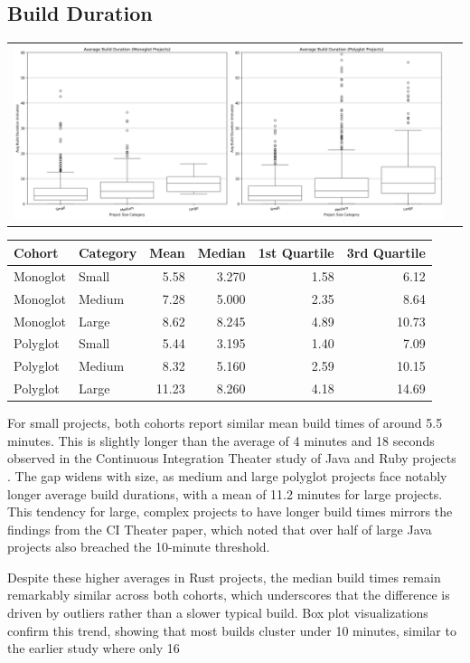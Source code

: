 \documentclass[11pt]{article}
\begin{document}
\subsection{Build Duration}
\begin{tabularx}{\linewidth}{@{}XX@{}}
\includegraphics[width=\linewidth]{figures/build_duration.jpg}
\end{tabularx}
\begin{center}
\begin{tabular}{llrrrr}
Cohort & Category & Mean & Median & 1st Quartile & 3rd Quartile\\
\hline
Monoglot & Small & 5.58 & 3.270 & 1.58 & 6.12\\
Monoglot & Medium & 7.28 & 5.000 & 2.35 & 8.64\\
Monoglot & Large & 8.62 & 8.245 & 4.89 & 10.73\\
Polyglot & Small & 5.44 & 3.195 & 1.40 & 7.09\\
Polyglot & Medium & 8.32 & 5.160 & 2.59 & 10.15\\
Polyglot & Large & 11.23 & 8.260 & 4.18 & 14.69\\
\end{tabular}
\end{center}

For small projects, both cohorts report similar mean build times of around 5.5 minutes. This is slightly longer than the average of 4 minutes and 18 seconds observed in the Continuous Integration Theater study of Java and Ruby projects \autocite{felidre2019ci_theater}. The gap widens with size, as medium and large polyglot projects face notably longer average build durations, with a mean of 11.2 minutes for large projects. This tendency for large, complex projects to have longer build times mirrors the findings from the CI Theater paper, which noted that over half of large Java projects also breached the 10-minute threshold.

Despite these higher averages in Rust projects, the median build times remain remarkably similar across both cohorts, which underscores that the difference is driven by outliers rather than a slower typical build. Box plot visualizations confirm this trend, showing that most builds cluster under 10 minutes, similar to the earlier study where only 16%
\end{document}
